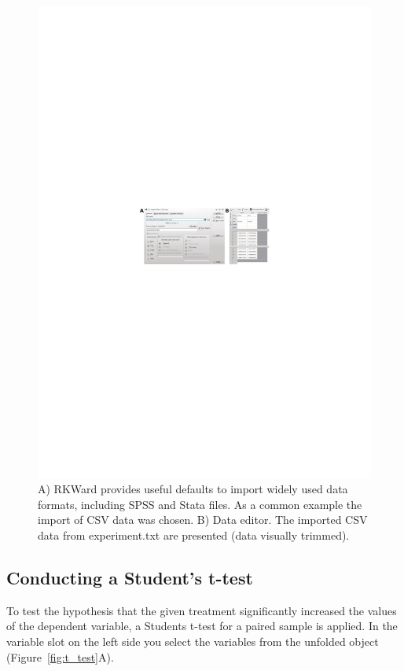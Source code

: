 \begin{figure}[htp]
 \centering
 \includegraphics[clip=true,trim=0cm 5.7cm 0cm 5.7cm,width=16cm]{../figures/import_data.pdf}
 \caption{A) RKWard provides useful defaults
to import widely used data formats, including SPSS and Stata files. As
a common example the import of CSV data was chosen. B) Data editor. The imported CSV
data from experiment.txt are presented (data visually trimmed).}
 \label{fig:import_data}
\end{figure}

\subsection{Conducting a Student's t-test}
\label{sec:conducting_ttest}
To test the hypothesis that the given treatment significantly increased
the values of the dependent variable, a Students
t-test for a paired sample is applied. In the variable slot on the left
side you select the variables from the unfolded
 object (Figure~\ref{fig:t_test}A).

